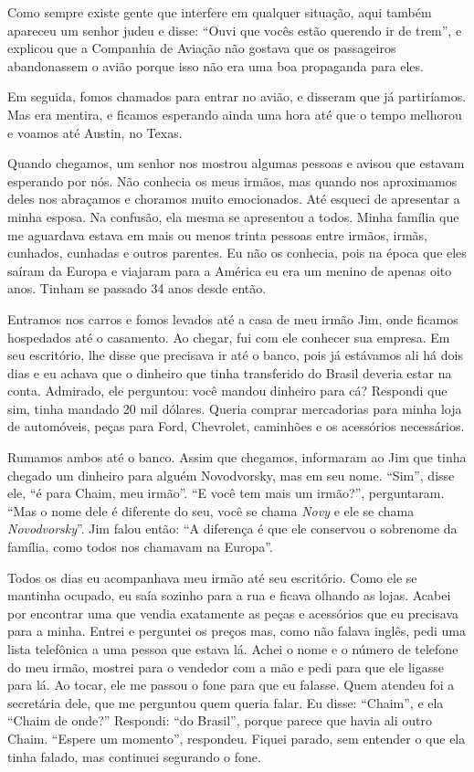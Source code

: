 Como sempre existe gente que interfere em qualquer situação, aqui também
apareceu um senhor judeu e disse: ``Ouvi que vocês estão querendo ir de
trem'', e explicou que a Companhia de Aviação não gostava que os
passageiros abandonassem o avião porque isso não era uma boa propaganda
para eles.

Em seguida, fomos chamados para entrar no avião, e disseram que já
partiríamos. Mas era mentira, e ficamos esperando ainda uma hora até que o
tempo melhorou e voamos até Austin, no Texas.

Quando chegamos, um senhor nos mostrou algumas pessoas
e avisou que estavam esperando por nós. Não conhecia os meus irmãos, mas
quando nos aproximamos deles nos abraçamos e choramos muito emocionados. 
Até esqueci de apresentar a minha esposa. Na confusão, ela mesma se
apresentou a todos. Minha família que me aguardava estava em 
mais ou menos trinta pessoas entre irmãos, irmãs, cunhados, cunhadas e
outros parentes. Eu não os conhecia, pois na época que eles saíram da
Europa e viajaram para a América eu era um menino de apenas oito anos.
Tinham se passado 34 anos desde então.

Entramos nos carros e fomos levados até a casa de meu irmão Jim,
onde ficamos hospedados até o casamento. Ao chegar, fui com ele conhecer
sua empresa. Em seu escritório, lhe disse que
precisava ir até o banco, pois já estávamos ali há dois dias e eu achava
que o dinheiro que tinha transferido do Brasil deveria estar na conta.
Admirado, ele perguntou: você mandou dinheiro para cá? Respondi que sim,
tinha mandado 20 mil dólares. Queria comprar mercadorias para minha
loja de automóveis, peças para Ford, Chevrolet, caminhões 
e os acessórios necessários.

Rumamos ambos até o banco. Assim que chegamos, informaram ao Jim que tinha
chegado um dinheiro para alguém Novodvorsky, mas em seu nome. ``Sim'',
disse ele, ``é para Chaim, meu irmão''. ``E você tem mais um
irmão?'', perguntaram. ``Mas o nome dele é diferente do seu, você se
chama \textit{Novy} e ele se chama \textit{Novodvorsky}''. Jim falou então: ``A diferença é
que ele conservou o sobrenome da família, como todos nos chamavam na
Europa''.

Todos os dias eu acompanhava meu irmão até seu escritório. Como ele
se mantinha ocupado, eu saía sozinho para a rua e ficava
olhando as lojas. Acabei por encontrar uma que vendia exatamente as peças e
acessórios que eu precisava para a minha. Entrei e perguntei
os preços mas, como não falava inglês, pedi uma lista telefônica a uma
pessoa que estava lá. Achei o nome e o número de telefone do meu irmão,
mostrei para o vendedor com a mão e pedi para que ele ligasse para lá.
Ao tocar, ele me passou o fone para que eu falasse. Quem
atendeu foi a secretária dele, que me perguntou quem queria
falar. Eu disse: ``Chaim'', e ela ``Chaim de onde?'' Respondi: ``do Brasil'', porque
parece que havia ali outro Chaim. ``Espere um momento'', respondeu. Fiquei
parado, sem entender o que ela tinha falado, mas
continuei segurando o fone.

